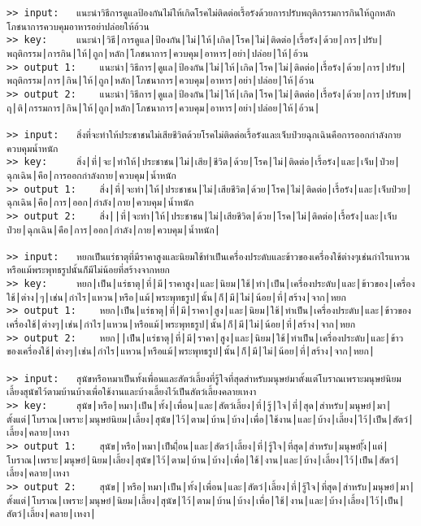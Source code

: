 \documentclass[11pt]{article}
\begin{document}
\begin{Verbatim}[commandchars=\\\{\}]
>> input:	แนะนำวิธีการดูแลป้องกันไม่ให้เกิดโรคไม่ติดต่อเรื้อรังด้วยการปรับพฤติกรรมการกินให้ถูกหลักโภชนาการควบคุมอาหารอย่าปล่อยให้อ้วน
>> key:		แนะนำ|วิธี|การดูแล|ป้องกัน|ไม่|ให้|เกิด|โรค|ไม่|ติดต่อ|เรื้อรัง|ด้วย|การ|ปรับ|พฤติกรรม|การกิน|ให้|ถูก|หลัก|โภชนาการ|ควบคุม|อาหาร|อย่า|ปล่อย|ให้|อ้วน
>> output 1:	แนะนำ|วิธีการ|ดูแล|ป้องกัน|ไม่|ให้|เกิด|โรค|ไม่|ติดต่อ|เรื้อรัง|ด้วย|การ|ปรับ|พฤติกรรม|การ|กิน|ให้|ถูก|หลัก|โภชนาการ|ควบคุม|อาหาร|อย่า|ปล่อย|ให้|อ้วน
>> output 2:	แนะนำ|วิธีการ|ดูแล|ป้องกัน|ไม่|ให้|เกิด|โรค|ไม่|ติดต่อ|เรื้อรัง|ด้วย|การ|ปรับพ|ฤ|ติ|กรรมการ|กิน|ให้|ถูก|หลัก|โภชนาการ|ควบคุม|อาหาร|อย่า|ปล่อย|ให้|อ้วน|

>> input:	สิ่งที่จะทำให้ประชาชนไม่เสียชีวิตด้วยโรคไม่ติดต่อเรื้อรังและเจ็บป่วยฉุกเฉินคือการออกกำลังกายควบคุมน้ำหนัก
>> key:		สิ่ง|ที่|จะ|ทำให้|ประชาชน|ไม่|เสีย|ชีวิต|ด้วย|โรค|ไม่|ติดต่อ|เรื้อรัง|และ|เจ็บ|ป่วย|ฉุกเฉิน|คือ|การออกกำลังกาย|ควบคุม|น้ำหนัก
>> output 1:	สิ่ง|ที่|จะทำ|ให้|ประชาชน|ไม่|เสียชีวิต|ด้วย|โรค|ไม่|ติดต่อ|เรื้อรัง|และ|เจ็บป่วย|ฉุกเฉิน|คือ|การ|ออก|กำลัง|กาย|ควบคุม|น้ำหนัก
>> output 2:	สิ่ง||ที่|จะทำ|ให้|ประชาชน|ไม่|เสียชีวิต|ด้วย|โรค|ไม่|ติดต่อ|เรื้อรัง|และ|เจ็บป่วย|ฉุกเฉิน|คือ|การ|ออก|กำลัง|กาย|ควบคุม|น้ำหนัก|

>> input:	หยกเป็นแร่ธาตุที่มีราคาสูงและนิยมใช้ทำเป็นเครื่องประดับและข้าวของเครื่องใช้ต่างๆเช่นกำไรแหวนหรือแม้พระพุทธรูปนั้นก็มีไม่น้อยที่สร้างจากหยก
>> key:		หยก|เป็น|แร่ธาตุ|ที่|มี|ราคาสูง|และ|นิยม|ใช้|ทำ|เป็น|เครื่องประดับ|และ|ข้าวของ|เครื่องใช้|ต่าง|ๆ|เช่น|กำไร|แหวน|หรือ|แม้|พระพุทธรูป|นั้น|ก็|มี|ไม่|น้อย|ที่|สร้าง|จาก|หยก
>> output 1:	หยก|เป็น|แร่ธาตุ|ที่|มี|ราคา|สูง|และ|นิยม|ใช้|ทำเป็น|เครื่องประดับ|และ|ข้าวของเครื่องใช้|ต่างๆ|เช่น|กำไร|แหวน|หรือแม้|พระพุทธรูป|นั้น|ก็|มี|ไม่|น้อย|ที่|สร้าง|จาก|หยก
>> output 2:	หยก||เป็น|แร่ธาตุ|ที่|มี|ราคา|สูง|และ|นิยม|ใช้|ทำเป็น|เครื่องประดับ|และ|ข้าวของเครื่องใช้|ต่างๆ|เช่น|กำไร|แหวน|หรือแม้|พระพุทธรูป|นั้น|ก็|มี|ไม่|น้อย|ที่|สร้าง|จาก|หยก|

>> input:	สุนัขหรือหมาเป็นทั้งเพื่อนและสัตว์เลี้ยงที่รู้ใจที่สุดสำหรับมนุษย์มาตั้งแต่โบราณเพราะมนุษย์นิยมเลี้ยงสุนัขไว้ตามบ้านบ้างเพื่อใช้งานและบ้างเลี้ยงไว้เป็นสัตว์เลี้ยงคลายเหงา
>> key:		สุนัข|หรือ|หมา|เป็น|ทั้ง|เพื่อน|และ|สัตว์เลี้ยง|ที่|รู้|ใจ|ที่|สุด|สำหรับ|มนุษย์|มา|ตั้งแต่|โบราณ|เพราะ|มนุษย์นิยม|เลี้ยง|สุนัข|ไว้|ตาม|บ้าน|บ้าง|เพื่อ|ใช้งาน|และ|บ้าง|เลี้ยง|ไว้|เป็น|สัตว์|เลี้ยง|คลาย|เหงา
>> output 1:	สุนัข|หรือ|หมา|เป็น|ื่อน|และ|สัตว์|เลี้ยง|ที่|รู้ใจ|ที่สุด|สำหรับ|มนุษย์|ั้ง|แต่|โบราณ|เพราะ|มนุษย์|นิยม|เลี้ยง|สุนัข|ไว้|ตาม|บ้าน|บ้าง|เพื่อ|ใช้|งาน|และ|บ้าง|เลี้ยง|ไว้|เป็น|สัตว์|เลี้ยง|คลาย|เหงา
>> output 2:	สุนัข||หรือ|หมา|เป็น|ทั้ง|เพื่อน|และ|สัตว์|เลี้ยง|ที่|รู้ใจ|ที่สุด|สำหรับ|มนุษย์|มา|ตั้งแต่|โบราณ|เพราะ|มนุษย์|นิยม|เลี้ยง|สุนัข|ไว้|ตาม|บ้าน|บ้าง|เพื่อ|ใช้|งาน|และ|บ้าง|เลี้ยง|ไว้|เป็น|สัตว์|เลี้ยง|คลาย|เหงา|


\end{Verbatim}
\end{document}
